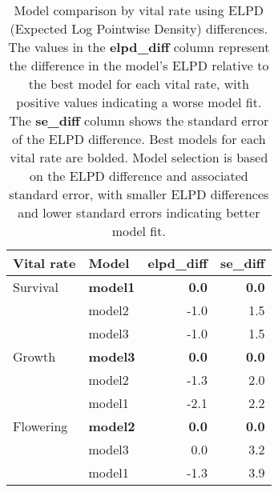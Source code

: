 \documentclass[12pt]{article}\usepackage[]{graphicx}\usepackage[dvipsnames]{xcolor}
\begin{document}
\begin{table}[H]
\caption{Model comparison by vital rate using ELPD (Expected Log Pointwise Density) differences. The values in the \textbf{elpd\_diff} column represent the difference in the model's ELPD relative to the best model for each vital rate, with positive values indicating a worse model fit. The \textbf{se\_diff} column shows the standard error of the ELPD difference. Best models for each vital rate are bolded. Model selection is based on the ELPD difference and associated standard error, with smaller ELPD differences and lower standard errors indicating better model fit.}
\centering
\begin{tabular}{|l|l|r|r|}
\hline
\textbf{Vital rate} & \textbf{Model} & \textbf{elpd\_diff} & \textbf{se\_diff} \\
\hline
Survival   & \textbf{model1} & \textbf{0.0}   & \textbf{0.0} \\
           & model2          & -1.0           & 1.5          \\
           & model3          & -1.0           & 1.5          \\
\hline
Growth     & \textbf{model3} & \textbf{0.0}   & \textbf{0.0} \\
           & model2          & -1.3           & 2.0          \\
           & model1          & -2.1           & 2.2          \\
\hline
Flowering  & \textbf{model2} & \textbf{0.0}   & \textbf{0.0} \\
           & model3          & 0.0            & 3.2          \\
           & model1          & -1.3           & 3.9          \\
\hline
\end{tabular}
\label{tab:elpd_vital_rates}
\end{table}
\end{document}
